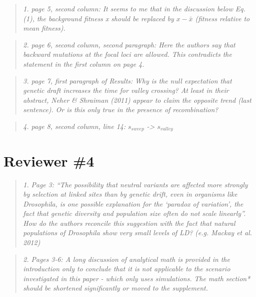 \documentclass[11pt]{article}
\newenvironment{reviewerquote}{\begin{quote}\color{black}\itshape}{\end{quote}}
\begin{document}
\begin{reviewerquote}
1. page 5, second column: It seems to me that in the discussion below Eq.(1), the background fitness x should be replaced by $x - \bar{x}$ (fitness relative to mean fitness). 
\end{reviewerquote}

\begin{reviewerquote}
2. page 6, second column, second paragraph: Here the authors say that backward mutations at the focal loci are allowed. This contradicts the statement in the first column on page 4.
\end{reviewerquote}


\begin{reviewerquote}
3. page 7, first paragraph of Results: Why is the null expectation that genetic draft increases the time for valley crossing? At least in their abstract, Neher \& Shraiman (2011) appear to claim the opposite trend (last sentence). Or is this only true in the presence of recombination?
\end{reviewerquote}


\begin{reviewerquote}
4. page 8, second column, line 14: $s_{sweep}$ -> $s_{valley}$
\end{reviewerquote}

\section*{Reviewer \#4}

\begin{reviewerquote}
1. Page 3: “The possibility that neutral variants are affected more strongly by selection at linked sites than by genetic drift, even in organisms like Drosophila, is one possible explanation for the ‘paradox of variation’, the fact that genetic diversity and population size often do not scale linearly”.
How do the authors reconcile this suggestion with the fact that natural populations of Drosophila show very small levels of LD? (e.g. Mackay et al. 2012)
\end{reviewerquote}

\begin{reviewerquote}
2. Pages 3-6: A long discussion of analytical math is provided in the introduction only to conclude that it is not applicable to the scenario investigated in this paper - which only uses simulations. The math section* should be shortened significantly or moved to the supplement.
\end{reviewerquote}
\end{document}
